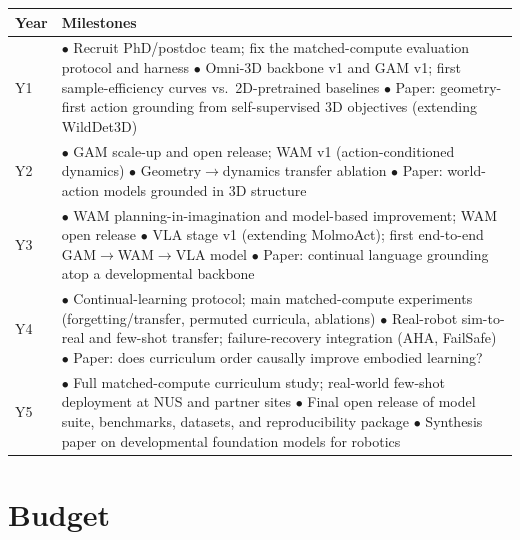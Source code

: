 \documentclass[11pt]{article}
\begin{document}
\medskip
\renewcommand{\arraystretch}{1.25}
\noindent\begin{tabularx}{\textwidth}{@{}p{1.1cm} X@{}}
\textbf{Year} & \textbf{Milestones} \\[2pt]
\hline
Y1 & $\bullet$ Recruit PhD/postdoc team; fix the matched-compute evaluation protocol and harness \newline
     $\bullet$ Omni-3D backbone v1 and GAM v1; first sample-efficiency curves vs.\ 2D-pretrained baselines \newline
     $\bullet$ Paper: geometry-first action grounding from self-supervised 3D objectives (extending WildDet3D\cite{wilddet3d}) \\
Y2 & $\bullet$ GAM scale-up and open release; WAM v1 (action-conditioned dynamics) \newline
     $\bullet$ Geometry$\rightarrow$dynamics transfer ablation \newline
     $\bullet$ Paper: world-action models grounded in 3D structure \\
Y3 & $\bullet$ WAM planning-in-imagination and model-based improvement; WAM open release \newline
     $\bullet$ VLA stage v1 (extending MolmoAct\cite{molmoact}); first end-to-end GAM$\rightarrow$WAM$\rightarrow$VLA model \newline
     $\bullet$ Paper: continual language grounding atop a developmental backbone \\
Y4 & $\bullet$ Continual-learning protocol; main matched-compute experiments (forgetting/transfer, permuted curricula, ablations) \newline
     $\bullet$ Real-robot sim-to-real and few-shot transfer; failure-recovery integration (AHA\cite{aha}, FailSafe\cite{failsafe}) \newline
     $\bullet$ Paper: does curriculum order causally improve embodied learning? \\
Y5 & $\bullet$ Full matched-compute curriculum study; real-world few-shot deployment at NUS and partner sites \newline
     $\bullet$ Final open release of model suite, benchmarks, datasets, and reproducibility package \newline
     $\bullet$ Synthesis paper on developmental foundation models for robotics \\
\hline
\end{tabularx}

\section{Budget}
\end{document}
